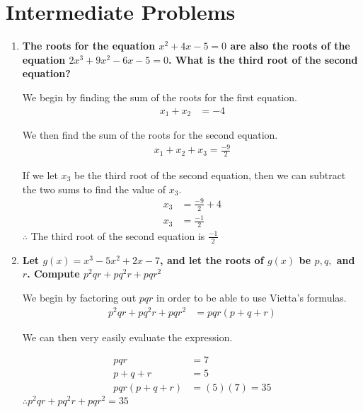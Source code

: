 \documentclass[12pt]{article}
\begin{document}
\section*{Intermediate Problems}
\begin{enumerate}
    \item \textbf{The roots for the equation $x^2 + 4x - 5 = 0$ are also the roots of the equation $2x^3 + 9x^2 - 6x - 5 = 0$. What is the third root of the second equation?}
    
    We begin by finding the sum of the roots for the first equation.
    \begin{align*}
        x_1+x_2&=-4
    \end{align*}
    
    We then find the sum of the roots for the second equation.
    \begin{align*}
        x_1+x_2+x_3=\frac{-9}{2}
    \end{align*}
    
    If we let $x_3$ be the third root of the second equation, then we can subtract the two sums to find the value of $x_3$.
    \begin{align*}
        x_3&=\frac{-9}{2}+4 \\
        x_3&=\frac{-1}{2}
    \end{align*}
    $\therefore$ The third root of the second equation is $\frac{-1}{2}$
    
    \item \textbf{Let $g(x) = x^3 - 5x^2 + 2x - 7$, and let the roots of $g(x)$ be $p, q,$ and $r$. Compute $p^2qr + pq^2r + pqr^2$}
    
    We begin by factoring out $pqr$ in order to be able to use Vietta's formulas.
    \begin{align*}
        p^2qr+pq^2r+pqr^2&=pqr(p+q+r)
    \end{align*}
    
    We can then very easily evaluate the expression.
    
    \begin{align*}
        pqr&=7 \\
        p+q+r&=5 \\
        pqr(p+q+r)&=(5)(7)=35
    \end{align*}
    $\therefore p^2qr+pq^2r+pqr^2=35$
    
\end{enumerate}
\newpage
\end{document}

